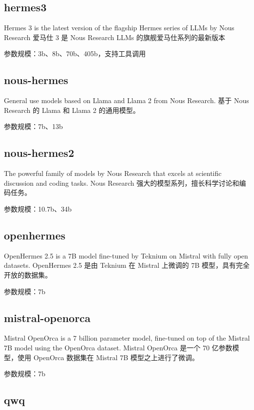 \documentclass[12pt,UTF8]{ctexbook}
\begin{document}
\subsection{hermes3}

Hermes 3 is the latest version of the flagship Hermes series of LLMs by Nous Research
爱马仕 3 是 Nous Research LLMs 的旗舰爱马仕系列的最新版本

参数规模：3b、8b、70b、405b，支持工具调用

\subsection{nous-hermes}

General use models based on Llama and Llama 2 from Nous Research.
基于 Nous Research 的 Llama 和 Llama 2 的通用模型。

参数规模：7b、13b

\subsection{nous-hermes2}

The powerful family of models by Nous Research that excels at scientific discussion and coding tasks.
Nous Research 强大的模型系列，擅长科学讨论和编码任务。

参数规模：10.7b、34b

\subsection{openhermes}

OpenHermes 2.5 is a 7B model fine-tuned by Teknium on Mistral with fully open datasets.
OpenHermes 2.5 是由 Teknium 在 Mistral 上微调的 7B 模型，具有完全开放的数据集。

参数规模：7b

\subsection{mistral-openorca}

Mistral OpenOrca is a 7 billion parameter model, fine-tuned on top of the Mistral 7B model using the OpenOrca dataset.
Mistral OpenOrca 是一个 70 亿参数模型，使用 OpenOrca 数据集在 Mistral 7B 模型之上进行了微调。

参数规模：7b

\subsection{qwq}
\end{document}
